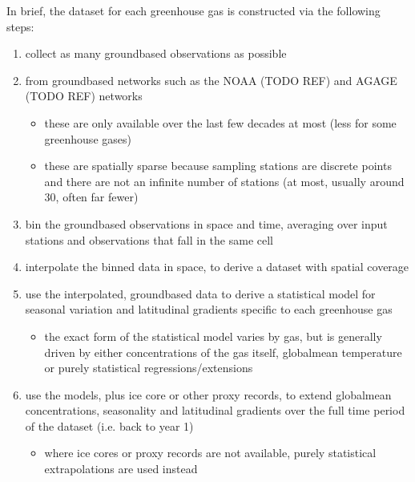 \documentclass[letterpaper,10pt,english]{jupyterBook}
\begin{document}
\sphinxAtStartPar
In brief, the dataset for each greenhouse gas is constructed via the following steps:
\begin{enumerate}
%
\item {}
\sphinxAtStartPar
collect as many ground\sphinxhyphen{}based observations as possible

\item {}
\sphinxAtStartPar
from ground\sphinxhyphen{}based networks such as the NOAA (TODO REF)
and AGAGE (TODO REF) networks
\begin{itemize}
\item {}
\sphinxAtStartPar
these are only available over the last few decades at most
(less for some greenhouse gases)

\item {}
\sphinxAtStartPar
these are spatially sparse because sampling stations
are discrete points and there are not an infinite number of stations
(at most, usually around 30, often far fewer)

\end{itemize}

\item {}
\sphinxAtStartPar
bin the ground\sphinxhyphen{}based observations in space and time,
averaging over input stations and observations that fall in the same cell

\item {}
\sphinxAtStartPar
interpolate the binned data in space, to derive a dataset with spatial coverage

\item {}
\sphinxAtStartPar
use the interpolated, ground\sphinxhyphen{}based data
to derive a statistical model for seasonal variation and latitudinal gradients
specific to each greenhouse gas
\begin{itemize}
\item {}
\sphinxAtStartPar
the exact form of the statistical model varies by gas,
but is generally driven by either concentrations of the gas itself,
global\sphinxhyphen{}mean temperature or purely statistical regressions/extensions

\end{itemize}

\item {}
\sphinxAtStartPar
use the models, plus ice core or other proxy records,
to extend global\sphinxhyphen{}mean concentrations, seasonality and latitudinal gradients
over the full time period of the dataset (i.e. back to year 1)
\begin{itemize}
\item {}
\sphinxAtStartPar
where ice cores or proxy records are not available,
purely statistical extrapolations are used instead


\end{itemize}
\end{enumerate}
\end{document}
